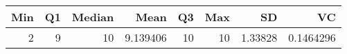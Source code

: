 
\begin{tabular}[t]{rrrrrrrr}
\toprule
Min & Q1 & Median & Mean & Q3 & Max & SD & VC\\
\midrule
2 & 9 & 10 & 9.139406 & 10 & 10 & 1.33828 & 0.1464296\\
\bottomrule
\end{tabular}